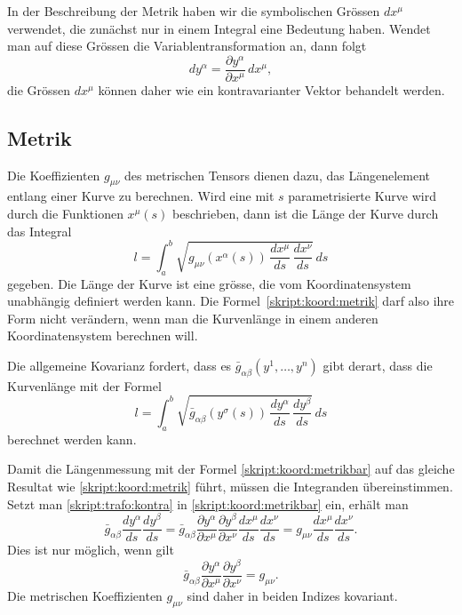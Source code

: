 In der Beschreibung der Metrik haben wir die symbolischen Grössen $dx^\mu$
verwendet, die zunächst nur in einem Integral eine Bedeutung haben.
Wendet man auf diese Grössen die Variablentransformation an, dann
folgt
\[
dy^\alpha
=
\frac{\partial y^\alpha}{\partial x^\mu}\,dx^\mu,
\]
die Grössen $dx^\mu$ können daher wie ein kontravarianter Vektor behandelt
werden.

\subsection{Metrik}
Die Koeffizienten $g_{\mu\nu}$ des metrischen Tensors dienen dazu,
das Längenelement entlang einer Kurve zu berechnen.
Wird eine mit $s$ parametrisierte Kurve wird durch die Funktionen
$x^\mu(s)$ beschrieben, dann ist die Länge der Kurve durch das
Integral
\begin{equation}
l = \int_a^b
\sqrt{g_{\mu\nu}(x^\alpha(s))\,\frac{dx^\mu}{ds}\,\frac{dx^\nu}{ds}}
\,ds
\label{skript:koord:metrik}
\end{equation}
gegeben.
Die Länge der Kurve ist eine grösse, die vom Koordinatensystem 
unabhängig definiert werden kann.
Die Formel~\eqref{skript:koord:metrik} darf also ihre Form nicht verändern,
wenn man die Kurvenlänge in einem anderen Koordinatensystem berechnen will.

Die allgemeine Kovarianz fordert, dass es $\bar g_{\alpha\beta}(y^1,\dots,y^n)$
gibt derart, dass die Kurvenlänge mit der Formel
\begin{equation}
l = \int_a^b
\sqrt{\bar g_{\alpha\beta}(y^\sigma(s))\,\frac{dy^\alpha}{ds}\,\frac{dy^\beta}{ds}}
\,ds
\label{skript:koord:metrikbar}
\end{equation}
berechnet werden kann.

Damit die Längenmessung mit der Formel
\eqref{skript:koord:metrikbar} auf das gleiche Resultat wie 
\eqref{skript:koord:metrik} führt, müssen die Integranden übereinstimmen.
Setzt man \eqref{skript:trafo:kontra} in \eqref{skript:koord:metrikbar}
ein, erhält man
\begin{equation*}
\bar g_{\alpha\beta}
\frac{dy^\alpha}{ds}\frac{dy^\beta}{ds}
=
\bar g_{\alpha\beta}
\frac{\partial y^\alpha}{\partial x^\mu}
\frac{\partial y^\beta}{\partial x^\nu}
\frac{dx^\mu}{ds}\frac{dx^\nu}{ds}
=
g_{\mu\nu}
\frac{dx^\mu}{ds}\frac{dx^\nu}{ds}.
\end{equation*}
Dies ist nur möglich, wenn gilt
\begin{equation}
\bar g_{\alpha\beta}
\frac{\partial y^\alpha}{\partial x^\mu}
\frac{\partial y^\beta}{\partial x^\nu}
=
g_{\mu\nu}.
\end{equation}
Die metrischen Koeffizienten $g_{\mu\nu}$ sind daher in beiden
Indizes kovariant.

